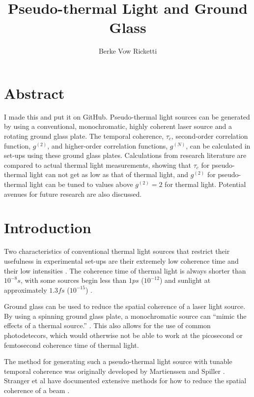 \documentclass{article}
\title{Pseudo-thermal Light and Ground Glass}
\author{Berke Vow Ricketti}
\begin{document}
\maketitle{}





\section{Abstract}

I made this and put it on GitHub.
Pseudo-thermal light sources can be generated by using a conventional, monochromatic, highly coherent laser source and a rotating ground glass plate. The temporal coherence, $\tau_{c}$, second-order correlation function, $g^{(2)}$, and higher-order correlation functions, $g^{(N)}$, can be calculated in set-ups using these ground glass plates. Calculations from research literature are compared to actual thermal light measurements, showing that $\tau_{c}$ for pseudo-thermal light can not get as low as that of thermal light, and $g^{(2)}$ for pseudo-thermal light can be tuned to values above $g^{(2)} = 2$ for thermal light. Potential avenues for future research are also discussed.

\section{Introduction}

Two characteristics of conventional thermal light sources that restrict their
usefulness in experimental set-ups are their extremely low coherence time and
their low intensities \cite{Spiller2014}. The coherence time of thermal light is
always shorter than $10^{-8}s$, with some sources begin less than $1 ps$ ($10^{-12}$)
and sunlight at approximately $1.3fs$ ($10^{-15}$) \cite{Spiller2014,Deutsch}.

Ground glass can be used to reduce the spatial coherence of a laser light source. By using a spinning ground glass plate, a monochromatic source can ``mimic the effects of a thermal source.'' \cite{Grider1996}. This also allows for the use of common photodetecors, which would otherwise not be able to work at the picosecond or femtosecond coherence time of thermal light.

The method for generating such a pseudo-thermal light source with tunable
temporal coherence was originally developed by Martienssen and Spiller \cite{Spiller2014}. Stranger et al have documented extensive methods for how to reduce the spatial coherence of a beam \cite{Ndersson2017}.
\end{document}
